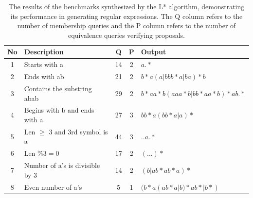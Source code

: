 \begin{table}[h!]
	\centering
	\caption{The results of the benchmarks synthesized by the L* algorithm, demonstrating its performance in generating regular expressions. The Q column refers to the number of membership queries and the P column refers to the number of equivalence queries verifying proposals.}
	\label{tab:l_star_outputs}
		\begin{tabular}{|c|l|c|c|l|}
		\hline
		\textbf{No} & \textbf{Description} & \textbf{Q} & \textbf{P} & \textbf{Output} \\
		\hline
		1 & Starts with a & 14 & 2 & $a.*$ \\
		2 & Ends with ab & 21 & 2 & $b*a(a|bbb*a|ba)*b$ \\
		3 & Contains the substring abab & 29 & 2 & $b*aa*b(aaa*b|bb*aa*b)*ab.*$ \\
		4 & Begins with b and ends with a & 27 & 3 & $bb*a(bb*a|a)*$ \\
		5 & Len $\ge$ 3 and 3rd symbol is a & 44 & 3 & $..a.*$ \\
		6 & Len $\% 3 = 0$ & 17 & 2 & $(...)*$ \\
		7 & Number of a's is divisible by 3 & 14 & 2 & $(b|ab*ab*a)*$ \\
		8 & Even number of a's & 5 & 1 & $(b*a(ab*a|b)*ab*|b*)$ \\
		\hline
	\end{tabular}
	\end{table}

